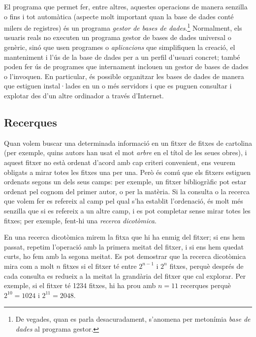 El programa que permet fer, entre altres, aquestes operacions de
manera senzilla o fins i tot automàtica (aspecte molt important quan
la base de dades conté milers de registres) és un programa
\emph{gestor de bases de dades}.\footnote{De vegades, quan es parla
  desacuradament, s'anomena per metonímia \emph{base de dades} al
  programa gestor.}  Normalment, els usuaris reals no executen un
programa gestor de bases de dades universal o genèric, sinó que usen
programes o \emph{aplicacions} que simplifiquen la creació, el
manteniment i l'ús de la base de dades per a un perfil d'usuari
concret; també poden fer ús de programes que internament inclouen un
gestor de bases de dades o l'invoquen. En particular, és possible
organitzar les bases de dades de manera que estiguen instal·lades en
un o més servidors i que es puguen consultar i explotar des d'un altre
ordinador a través d'Internet.

\subsection{Recerques}

Quan volem buscar una determinada informació en un fitxer de fitxes de
cartolina (per exemple, quins autors han usat el mot \emph{arbre} en
el títol de les seues obres), i aquest fitxer no està ordenat d'acord
amb cap criteri convenient, ens veurem obligats a mirar totes les
fitxes una per una.  Però és comú que els fitxers estiguen ordenats
segons un dels seus camps: per exemple, un fitxer bibliogràfic pot
estar ordenat pel cognom del primer autor, o per la matèria. Si la
consulta o la recerca que volem fer es refereix al camp pel qual s'ha
establit l'ordenació, és molt més senzilla que si es refereix a un
altre camp, i es pot completar sense mirar totes les fitxes; per
exemple, fent-hi una \emph{recerca dicotòmica}.

En una recerca dicotòmica mirem la fitxa que hi ha enmig del fitxer;
si ens hem passat, repetim l'operació amb la primera meitat del
fitxer, i si ens hem quedat curts, ho fem amb la segona meitat. Es pot
demostrar que la recerca dicotòmica mira com a molt $n$ fitxes si el
fitxer té entre $2^{n-1}$ i $2^n$ fitxes, perquè després de cada
consulta es redueix a la meitat la grandària del fitxer que cal
explorar. Per exemple, si el fitxer té 1234 fitxes, hi ha prou amb
$n=11$ recerques perquè $2^{10}=1024$ i $2^{11}=2048$.

